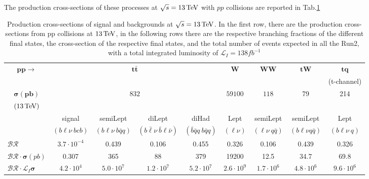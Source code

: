The production cross-sections of these processes  at $\sqrt{s}=13{\,\text{Te\hspace{-.08em}V}}$ with $pp$ collisions are reported in Tab.\ref{tab:cross}


\begin{table}[H]
    \centering
    \fontsize{9.2pt}{9.2pt}\selectfont
    \begin{tabular}{l|cccc|c|c|c|c}
        \toprule
          \multicolumn{1}{c|}{$\mathbf{pp\to}$}&\multicolumn{4}{c|}{$ \mathbf{t\bar{t}}$}&  $ \mathbf{W}$& $ \mathbf{WW}$ & $ \mathbf{tW}$& $ \mathbf{tq}$\\
          &&  &  &  &  &   & & (t-channel)\\
          \midrule
          \multicolumn{1}{c|}{$\mathbf{\sigma (pb)}$}&\multicolumn{4}{c|}{\multirow{2}{*}{$832$}}& \multirow{2}{*}{$59100$} & \multirow{2}{*}{$118$} &  \multirow{2}{*}{79}& \multirow{2}{*}{214} \\
          \multicolumn{1}{c|}{$(13{\,\text{Te\hspace{-.08em}V}})$}& &  & & &  &&&\\
          \midrule
          &signal&  semiLept&  diLept&  diHad& Lept &  semiLept & semiLept& Lept\\
          &$(b\ell \nu\: bcb)$&$(b\ell \nu\: b\bar{q}q)$&$(b\bar{\ell} \nu\: \bar{b}\ell \bar{\nu})$&$(\bar{b}\bar{q}q\: b\bar{q}q)$&$(\ell \nu)$&$(\ell \nu \: q\bar{q})$& $(b\ell\nu q \bar{q})$&$(b\ell\nu \: q)$\\
          \midrule
          $\mathcal{BR}$& $3.7 \cdot 10^{-4}$   & 0.439 & 0.106 & 0.455 & 0.326 & 0.106 & 0.439 & 0.326\\
          $ \mathcal{BR}\cdot\mathbf{\sigma} (pb)$& 0.307 & 365 & 88 & 379 & 19200 & 12.5 & 34.7& 69.8 \\
          $\mathcal{BR}\cdot\mathcal{L}_I\mathbf{\sigma} $&$4.2 \cdot 10^4$& $5.0 \cdot 10^7$ &  $1.2 \cdot 10^7$&$5.2 \cdot 10^7$  &  $2.6 \cdot 10^9$ & $1.7 \cdot 10^6$  & $4.8 \cdot 10^6$& $9.6 \cdot 10^{6}$\\
          \bottomrule
    \end{tabular}
    \vspace{0.2cm}
    \caption{Production cross-sections of signal and backgrounds at $\sqrt{s}=13{\,\text{Te\hspace{-.08em}V}}$. In the first row, there are the production cross-sections from pp collisions at $13 {\,\text{Te\hspace{-.08em}V}}$, in the following rows there are the respective branching fractions of the different final states, the cross-section of the respective final states, and the total number of events expected in all the Run2, with a total integrated luminosity of $\mathcal{L}_I=138 {fb}^{-1}$}
    \label{tab:cross}
\end{table}

